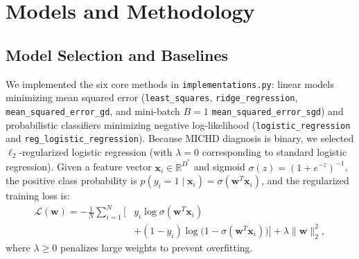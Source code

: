\documentclass[10pt,conference,compsocconf]{IEEEtran}
\begin{document}
\section{Models and Methodology}

\subsection{Model Selection and Baselines}
We implemented the six core methods in \texttt{implementations.py}: linear models minimizing mean squared error (\texttt{least\_squares}, \texttt{ridge\_regression}, \texttt{mean\_squared\_error\_gd}, and mini-batch $B=1$ \texttt{mean\_squared\_error\_sgd}) and probabilistic classifiers minimizing negative log-likelihood (\texttt{logistic\_regression} and \texttt{reg\_logistic\_regression}). Because MICHD diagnosis is binary, we selected $\ell_2$-regularized logistic regression (with $\lambda = 0$ corresponding to standard logistic regression). Given a feature vector $\mathbf{x}_i \in \mathbb{R}^{D^*}$ and sigmoid $\sigma(z) = (1 + e^{-z})^{-1}$, the positive class probability is $p(y_i = 1 \mid \mathbf{x}_i) = \sigma(\mathbf{w}^T \mathbf{x}_i)$, and the regularized training loss is:
\begin{equation}
\begin{aligned}
    \mathcal{L}(\mathbf{w}) = -\frac{1}{N} \sum_{i=1}^{N} \Big[ &y_i \log\sigma(\mathbf{w}^T \mathbf{x}_i) \\
    &+ (1 - y_i) \log\big(1 - \sigma(\mathbf{w}^T \mathbf{x}_i)\big) \Big] + \lambda \|\mathbf{w}\|_2^2,
\end{aligned}
\end{equation}
where $\lambda \geq 0$ penalizes large weights to prevent overfitting.
\end{document}
